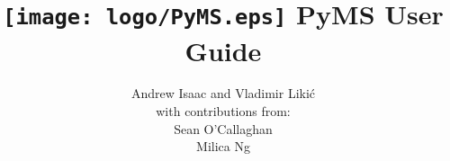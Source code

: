 \documentclass[twoside,a4paper]{book}
\begin{document}
\frontmatter

\title{\texttt{[image: logo/PyMS.eps]}
\Large{PyMS User Guide}}
\author{Andrew Isaac and Vladimir Liki\'{c}\\
with contributions from:\\
Sean O'Callaghan\\
Milica Ng
\medskip}

\medskip



\maketitle
\tableofcontents

\mainmatter


























\backmatter
\printindex
\end{document}
